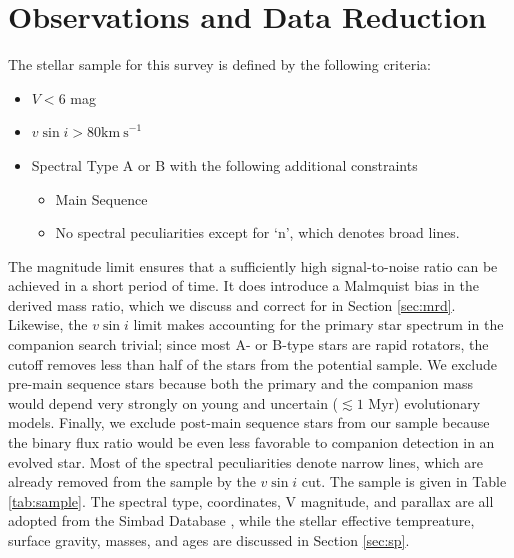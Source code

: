 \documentclass{emulateapj}
\begin{document}
\section{Observations and Data Reduction}
\label{sec:obs}

The stellar sample for this survey is defined by the following criteria:

\begin{itemize}
\item $V < 6$ mag
\item $v\sin{i} > 80 \mathrm{km\ s}^{-1}$
\item Spectral Type A or B with the following additional constraints
\begin{itemize}
  \item Main Sequence
  \item No spectral peculiarities except for `n', which denotes broad lines.
\end{itemize}
\end{itemize}

The magnitude limit ensures that a sufficiently high signal-to-noise ratio can be achieved in a short period of time. It does introduce a Malmquist bias in the derived mass ratio, which we discuss and correct for in Section \ref{sec:mrd}. Likewise, the $v\sin{i}$ limit makes accounting for the primary star spectrum in the companion search trivial; since most A- or B-type stars are rapid rotators, the cutoff removes less than half of the stars from the potential sample. We exclude pre-main sequence stars because both the primary and the companion mass would depend very strongly on young and uncertain ($\lesssim 1$ Myr) evolutionary models. Finally, we exclude post-main sequence stars from our sample because the binary flux ratio would be even less favorable to companion detection in an evolved star. Most of the spectral peculiarities denote narrow lines, which are already removed from the sample by the $v\sin{i}$ cut. The sample is given in Table \ref{tab:sample}. The spectral type, coordinates, V magnitude, and parallax are all adopted from the Simbad Database \citep{Simbad}, while the stellar effective tempreature, surface gravity, masses, and ages are discussed in Section \ref{sec:sp}.
\end{document}
